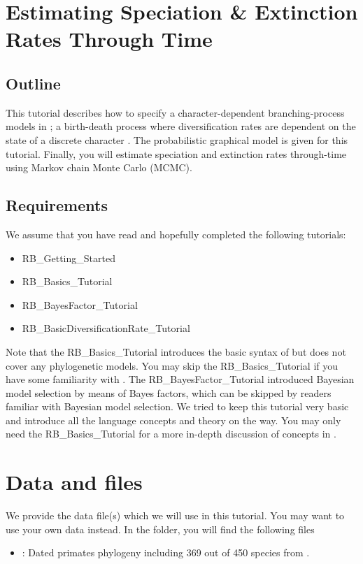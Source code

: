 \section{Estimating Speciation \& Extinction Rates Through Time}

\subsection{Outline}

This tutorial describes how to specify a character-dependent branching-process models in \RevBayes;
a birth-death process where diversification rates are dependent on the state of a discrete character \citep{Maddison2007,Fitzjohn2012}.
The probabilistic graphical model is given for this tutorial.
Finally, you will estimate speciation and extinction rates through-time using Markov chain Monte Carlo (MCMC).


\subsection{Requirements}
We assume that you have read and hopefully completed the following tutorials:
\begin{itemize}
\item RB\_Getting\_Started
\item RB\_Basics\_Tutorial
\item RB\_BayesFactor\_Tutorial
\item RB\_BasicDiversificationRate\_Tutorial
\end{itemize}
Note that the RB\_Basics\_Tutorial introduces the basic syntax of \Rev but does not cover any phylogenetic models.
You may skip the RB\_Basics\_Tutorial if you have some familiarity with \R.
The RB\_BayesFactor\_Tutorial introduced Bayesian model selection by means of Bayes factors, which can be skipped by readers familiar with Bayesian model selection.
We tried to keep this tutorial very basic and introduce all the language concepts and theory on the way.
You may only need the RB\_Basics\_Tutorial for a more in-depth discussion of concepts in \Rev.


\section{Data and files}

We provide the data file(s) which we will use in this tutorial.
You may want to use your own data instead.
In the  folder, you will find the following files
\begin{itemize}
\item {}: Dated primates phylogeny including 369 out of 450 species from .
\end{itemize}


